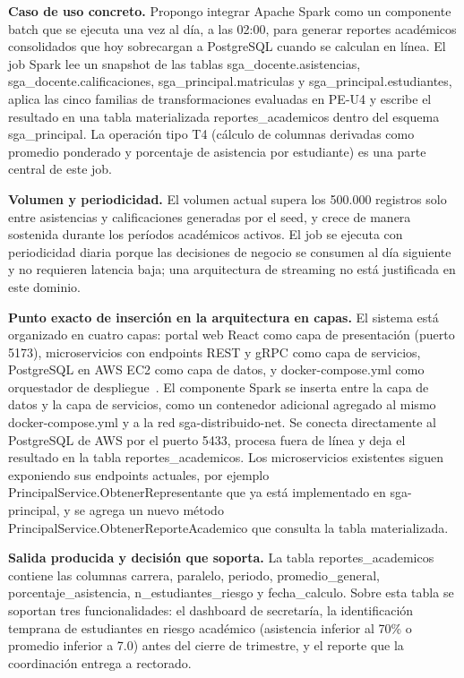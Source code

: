 \documentclass[11pt,a4paper]{article}
\begin{document}
\textbf{Caso de uso concreto.} Propongo integrar Apache Spark como un componente batch que se ejecuta una vez al día, a las 02:00, para generar reportes académicos consolidados que hoy sobrecargan a PostgreSQL cuando se calculan en línea. El job Spark lee un snapshot de las tablas sga\_docente.asistencias, sga\_docente.calificaciones, sga\_principal.matriculas y sga\_principal.estudiantes, aplica las cinco familias de transformaciones evaluadas en PE-U4 y escribe el resultado en una tabla materializada reportes\_academicos dentro del esquema sga\_principal. La operación tipo T4 (cálculo de columnas derivadas como promedio ponderado y porcentaje de asistencia por estudiante) es una parte central de este job.

\textbf{Volumen y periodicidad.} El volumen actual supera los 500.000 registros solo entre asistencias y calificaciones generadas por el seed, y crece de manera sostenida durante los períodos académicos activos. El job se ejecuta con periodicidad diaria porque las decisiones de negocio se consumen al día siguiente y no requieren latencia baja; una arquitectura de streaming no está justificada en este dominio.

\textbf{Punto exacto de inserción en la arquitectura en capas.} El sistema está organizado en cuatro capas: portal web React como capa de presentación (puerto 5173), microservicios con endpoints REST y gRPC como capa de servicios, PostgreSQL en AWS EC2 como capa de datos, y docker-compose.yml como orquestador de despliegue~\cite{alvarez2010}. El componente Spark se inserta entre la capa de datos y la capa de servicios, como un contenedor adicional agregado al mismo docker-compose.yml y a la red sga-distribuido-net. Se conecta directamente al PostgreSQL de AWS por el puerto 5433, procesa fuera de línea y deja el resultado en la tabla reportes\_academicos. Los microservicios existentes siguen exponiendo sus endpoints actuales, por ejemplo PrincipalService.ObtenerRepresentante que ya está implementado en sga-principal, y se agrega un nuevo método PrincipalService.ObtenerReporteAcademico que consulta la tabla materializada.

\textbf{Salida producida y decisión que soporta.} La tabla reportes\_academicos contiene las columnas carrera, paralelo, periodo, promedio\_general, porcentaje\_asistencia, n\_estudiantes\_riesgo y fecha\_calculo. Sobre esta tabla se soportan tres funcionalidades: el dashboard de secretaría, la identificación temprana de estudiantes en riesgo académico (asistencia inferior al 70\% o promedio inferior a 7.0) antes del cierre de trimestre, y el reporte que la coordinación entrega a rectorado.
\end{document}
